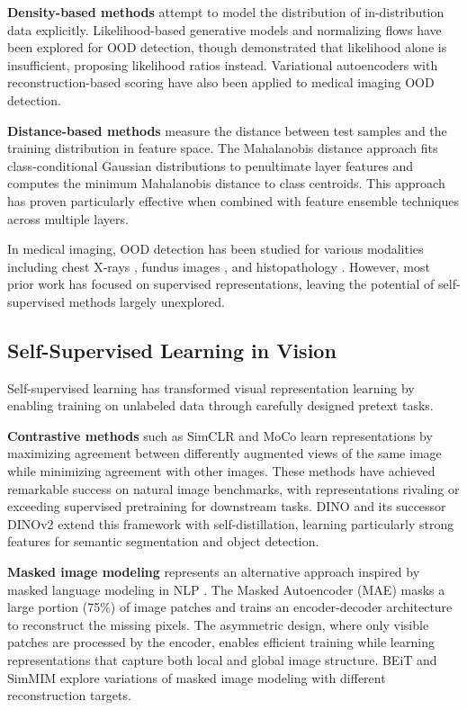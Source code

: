\documentclass[11pt,a4paper]{article}
\begin{document}
\textbf{Density-based methods} attempt to model the distribution of in-distribution data explicitly. Likelihood-based generative models \citep{nalisnick2019deep} and normalizing flows \citep{kirichenko2020normalizing} have been explored for OOD detection, though \citet{ren2019likelihood} demonstrated that likelihood alone is insufficient, proposing likelihood ratios instead. Variational autoencoders with reconstruction-based scoring \citep{an2015variational} have also been applied to medical imaging OOD detection.

\textbf{Distance-based methods} measure the distance between test samples and the training distribution in feature space. The Mahalanobis distance approach \citep{lee2018simple} fits class-conditional Gaussian distributions to penultimate layer features and computes the minimum Mahalanobis distance to class centroids. This approach has proven particularly effective when combined with feature ensemble techniques across multiple layers.

In medical imaging, OOD detection has been studied for various modalities including chest X-rays \citep{cao2020benchmark}, fundus images \citep{band2021benchmarking}, and histopathology \citep{linmans2020efficient}. However, most prior work has focused on supervised representations, leaving the potential of self-supervised methods largely unexplored.

\subsection{Self-Supervised Learning in Vision}

Self-supervised learning has transformed visual representation learning by enabling training on unlabeled data through carefully designed pretext tasks.

\textbf{Contrastive methods} such as SimCLR \citep{chen2020simple} and MoCo \citep{he2020momentum} learn representations by maximizing agreement between differently augmented views of the same image while minimizing agreement with other images. These methods have achieved remarkable success on natural image benchmarks, with representations rivaling or exceeding supervised pretraining for downstream tasks. DINO \citep{caron2021emerging} and its successor DINOv2 \citep{oquab2024dinov2} extend this framework with self-distillation, learning particularly strong features for semantic segmentation and object detection.

\textbf{Masked image modeling} represents an alternative approach inspired by masked language modeling in NLP \citep{devlin2019bert}. The Masked Autoencoder (MAE) \citep{he2022masked} masks a large portion (75\%) of image patches and trains an encoder-decoder architecture to reconstruct the missing pixels. The asymmetric design, where only visible patches are processed by the encoder, enables efficient training while learning representations that capture both local and global image structure. BEiT \citep{bao2022beit} and SimMIM \citep{xie2022simmim} explore variations of masked image modeling with different reconstruction targets.
\end{document}
